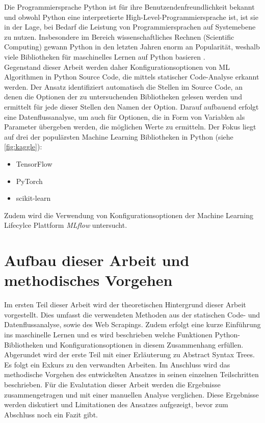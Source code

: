 \documentclass[german,bachelor]{swsLeipzig}
\begin{document}
Die Programmiersprache Python ist für ihre Benutzendenfreundlichkeit bekannt und obwohl Python eine interpretierte High-Level-Programmiersprache ist,
ist sie in der Lage, bei Bedarf die Leistung von Programmiersprachen auf Systemebene zu nutzen.
Insbesondere im Bereich wissenschaftliches Rechnen (Scientific Computing) gewann Python in den letzten Jahren enorm an Popularität,
weshalb viele Bibliotheken für maschinelles Lernen auf Python basieren \cite[]{2020}.\\

Gegenstand dieser Arbeit werden daher Konfigurationsoptionen von ML Algorithmen in Python Source Code, die mittels statischer Code-Analyse erkannt werden.
Der Ansatz identifiziert automatisch die Stellen im Source Code, an denen die Optionen der zu untersuchenden Bibliotheken gelesen werden
und ermittelt für jede dieser Stellen den Namen der Option.
Darauf aufbauend erfolgt eine Datenflussanalyse, um auch für Optionen, die in Form von Variablen als Parameter übergeben werden,
die möglichen Werte zu ermitteln.
Der Fokus liegt auf drei der populärsten Machine Learning Bibliotheken in Python (siehe \autoref{fig:kaggle}):
\begin{itemize}
 \item TensorFlow
 \item PyTorch
 \item scikit-learn
\end{itemize}
Zudem wird die Verwendung von Konfigurationsoptionen der Machine Learning Lifecylce Plattform \textit{MLflow} untersucht. \\


\section{Aufbau dieser Arbeit und methodisches Vorgehen}
Im ersten Teil dieser Arbeit wird der theoretischen Hintergrund dieser Arbeit vorgestellt.
Dies umfasst die verwendeten Methoden aus der statischen Code- und Datenflussanalyse, sowie des Web Scrapings.
Zudem erfolgt eine kurze Einführung ins maschinelle Lernen und es wird beschrieben welche Funktionen Python-Bibliotheken und
Konfigurationsoptionen in diesem Zusammenhang erfüllen.
Abgerundet wird der erste Teil mit einer Erläuterung zu Abstract Syntax Trees.
Es folgt ein Exkurs zu den verwandten Arbeiten.
Im Anschluss wird das methodische Vorgehen des entwickelten Ansatzes in seinen einzelnen Teilschritten beschrieben.
Für die Evalutation dieser Arbeit werden die Ergebnisse zusammengetragen und mit einer manuellen Analyse verglichen.
Diese Ergebnisse werden diskutiert und Limitationen des Ansatzes aufgezeigt, bevor zum Abschluss noch ein Fazit gibt.
\end{document}
